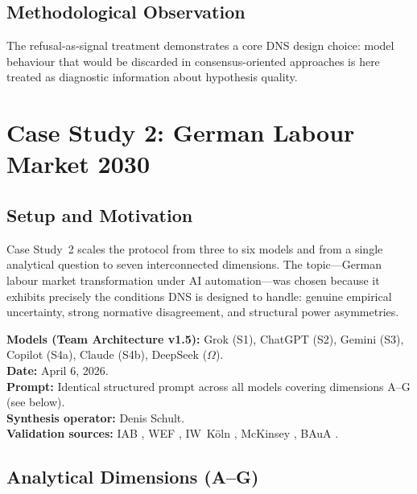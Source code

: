 \documentclass[10pt,a4paper]{article}
\begin{document}
\subsection{Methodological Observation}
The refusal-as-signal treatment demonstrates a core DNS design choice: model
behaviour that would be discarded in consensus-oriented approaches is here
treated as diagnostic information about hypothesis quality.

\section{Case Study 2: German Labour Market 2030}
\label{sec:cs2}

\subsection{Setup and Motivation}
Case Study~2 scales the protocol from three to six models and from a single
analytical question to seven interconnected dimensions. The topic—German labour
market transformation under AI automation—was chosen because it exhibits
precisely the conditions DNS is designed to handle: genuine empirical uncertainty,
strong normative disagreement, and structural power asymmetries.

\textbf{Models (Team Architecture v1.5):} Grok (S1), ChatGPT (S2), Gemini (S3),
Copilot (S4a), Claude (S4b), DeepSeek ($\Omega$).\\
\textbf{Date:} April 6, 2026.\\
\textbf{Prompt:} Identical structured prompt across all models covering dimensions
A–G (see below).\\
\textbf{Synthesis operator:} Denis Schult.\\
\textbf{Validation sources:} IAB \citep{iab2025}, WEF \citep{wef2025},
IW~Köln \citep{iw2025}, McKinsey \citep{mckinsey2024}, BAuA \citep{baua2025}.

\subsection{Analytical Dimensions (A--G)}
\end{document}
